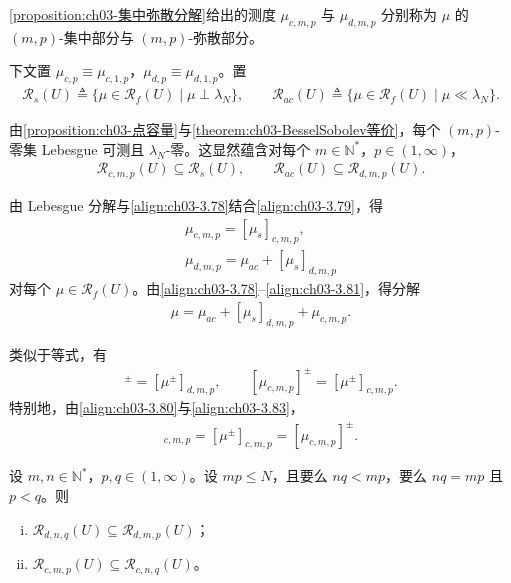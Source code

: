\documentclass[../../main.tex]{subfiles}%
\begin{document}
\begin{definition}\label{definition:ch03-集中弥散部分}
\cref{proposition:ch03-集中弥散分解}给出的测度 $\mu_{c,m,p}$ 与 $\mu_{d,m,p}$ 分别称为 $\mu$ 的 $(m,p)$-集中部分与 $(m,p)$-弥散部分。
\end{definition}

下文置 $\mu_{c,p}\equiv\mu_{c,1,p}$，$\mu_{d,p}\equiv\mu_{d,1,p}$。置
\begin{align*}
\mathscr{R}_s(U)\triangleq \{\mu\in\mathscr{R}_f(U)\mid\mu\perp\lambda_N\},\qquad
\mathscr{R}_{ac}(U)\triangleq \{\mu\in\mathscr{R}_f(U)\mid\mu\ll\lambda_N\}.
\end{align*}

由\cref{proposition:ch03-点容量}与\cref{theorem:ch03-BesselSobolev等价}，每个 $(m,p)$-零集 Lebesgue 可测且 $\lambda_N$-零。这显然蕴含对每个 $m\in\mathbb{N}^*$，$p\in(1,\infty)$，
\begin{align}
\mathscr{R}_{c,m,p}(U)\subseteq\mathscr{R}_s(U),\qquad
\mathscr{R}_{ac}(U)\subseteq\mathscr{R}_{d,m,p}(U).\label{align:ch03-3.79}
\end{align}

由 Lebesgue 分解与\eqref{align:ch03-3.78}结合\eqref{align:ch03-3.79}，得
\begin{align}
\mu_{c,m,p}=[\mu_s]_{c,m,p},\label{align:ch03-3.80}\\
\mu_{d,m,p}=\mu_{ac}+[\mu_s]_{d,m,p}\label{align:ch03-3.81}
\end{align}
对每个 $\mu\in\mathscr{R}_f(U)$。由\eqref{align:ch03-3.78}--\eqref{align:ch03-3.81}，得分解
\begin{align}
\mu=\mu_{ac}+[\mu_s]_{d,m,p}+\mu_{c,m,p}.\label{align:ch03-3.82}
\end{align}

\begin{remark}\label{remark:ch03-分解正负}
类似于等式，有
\begin{align}
[\mu_{d,m,p}]^\pm=[\mu^\pm]_{d,m,p},\qquad
[\mu_{c,m,p}]^\pm=[\mu^\pm]_{c,m,p}.\label{align:ch03-3.83}
\end{align}
特别地，由\eqref{align:ch03-3.80}与\eqref{align:ch03-3.83}，
\begin{align}
[\mu_s^\pm]_{c,m,p}=[\mu^\pm]_{c,m,p}=[\mu_{c,m,p}]^\pm.\label{align:ch03-3.84}
\end{align}
\end{remark}

\begin{proposition}\label{proposition:ch03-集中弥散包含}\label{proposition:ch03-容量包含}
设 $m,n\in\mathbb{N}^*$，$p,q\in(1,\infty)$。设 $mp\leqslant N$，且要么 $nq<mp$，要么 $nq=mp$ 且 $p<q$。则
\begin{enumerate}[(i)]
\item $\mathscr{R}_{d,n,q}(U)\subseteq\mathscr{R}_{d,m,p}(U)$；
\item $\mathscr{R}_{c,m,p}(U)\subseteq\mathscr{R}_{c,n,q}(U)$。
\end{enumerate}
\end{proposition}
\end{document}
